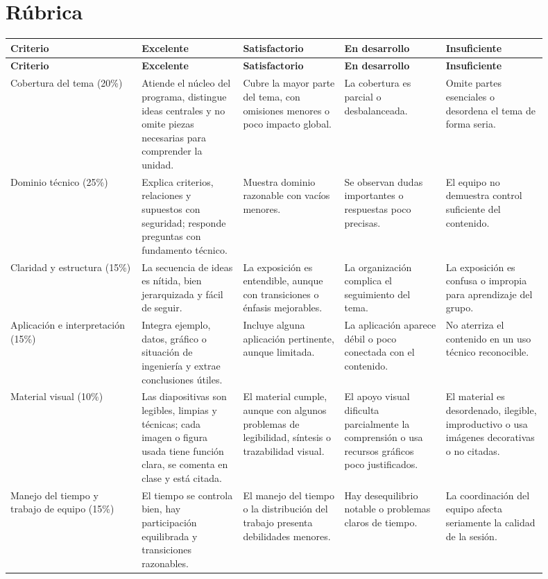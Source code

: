 \documentclass[11pt]{article}
\begin{document}
\section{Rúbrica}
\small
{\setlength{\tabcolsep}{4pt}
\begin{longtable}{@{}p{0.22\linewidth} p{0.17\linewidth} p{0.17\linewidth} p{0.17\linewidth} p{0.17\linewidth}@{}}
\toprule
\textbf{Criterio} & \textbf{Excelente} & \textbf{Satisfactorio} & \textbf{En desarrollo} & \textbf{Insuficiente} \\
\midrule
\endfirsthead
\toprule
\textbf{Criterio} & \textbf{Excelente} & \textbf{Satisfactorio} & \textbf{En desarrollo} & \textbf{Insuficiente} \\
\midrule
\endhead
Cobertura del tema (20\%) & Atiende el núcleo del programa, distingue ideas centrales y no omite piezas necesarias para comprender la unidad. & Cubre la mayor parte del tema, con omisiones menores o poco impacto global. & La cobertura es parcial o desbalanceada. & Omite partes esenciales o desordena el tema de forma seria. \\
Dominio técnico (25\%) & Explica criterios, relaciones y supuestos con seguridad; responde preguntas con fundamento técnico. & Muestra dominio razonable con vacíos menores. & Se observan dudas importantes o respuestas poco precisas. & El equipo no demuestra control suficiente del contenido. \\
Claridad y estructura (15\%) & La secuencia de ideas es nítida, bien jerarquizada y fácil de seguir. & La exposición es entendible, aunque con transiciones o énfasis mejorables. & La organización complica el seguimiento del tema. & La exposición es confusa o impropia para aprendizaje del grupo. \\
Aplicación e interpretación (15\%) & Integra ejemplo, datos, gráfico o situación de ingeniería y extrae conclusiones útiles. & Incluye alguna aplicación pertinente, aunque limitada. & La aplicación aparece débil o poco conectada con el contenido. & No aterriza el contenido en un uso técnico reconocible. \\
Material visual (10\%) & Las diapositivas son legibles, limpias y técnicas; cada imagen o figura usada tiene función clara, se comenta en clase y está citada. & El material cumple, aunque con algunos problemas de legibilidad, síntesis o trazabilidad visual. & El apoyo visual dificulta parcialmente la comprensión o usa recursos gráficos poco justificados. & El material es desordenado, ilegible, improductivo o usa imágenes decorativas o no citadas. \\
Manejo del tiempo y trabajo de equipo (15\%) & El tiempo se controla bien, hay participación equilibrada y transiciones razonables. & El manejo del tiempo o la distribución del trabajo presenta debilidades menores. & Hay desequilibrio notable o problemas claros de tiempo. & La coordinación del equipo afecta seriamente la calidad de la sesión. \\
\bottomrule
\end{longtable}
}
\normalsize
\end{document}
